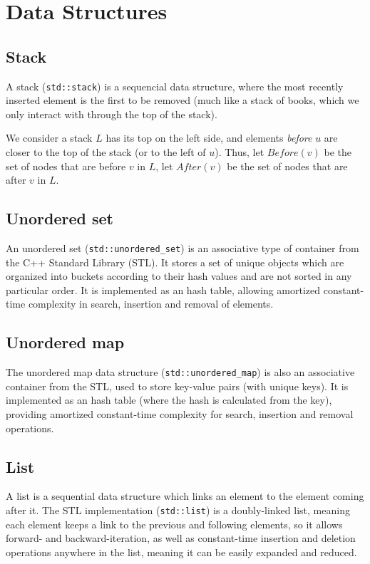 \chapter{Data Structures} \label{data-structures}

\section{Stack}
A stack (\texttt{std::stack}) is a sequencial data structure, where the most recently inserted element is the first to be removed (much like a stack of books, which we only interact with through the top of the stack).\par
We consider a stack $L$ has its top on the left side, and elements \emph{before} $u$ are closer to the top of the stack (or to the left of $u$). Thus, let $Before(v)$ be the set of nodes that are before $v$ in $L$, let $After(v)$ be the set of nodes that are after $v$ in $L$.

\section{Unordered set}
An unordered set (\texttt{std::unordered\_set}) is an associative type of container from the C++ Standard Library (STL). It stores a set of unique objects which are organized into buckets according to their hash values and are not sorted in any particular order. It is implemented as an hash table, allowing amortized constant-time complexity in search, insertion and removal of elements.

\section{Unordered map}
The unordered map data structure (\texttt{std::unordered\_map}) is also an associative container from the STL, used to store key-value pairs (with unique keys). It is implemented as an hash table (where the hash is calculated from the key), providing amortized constant-time complexity for search, insertion and removal operations.

\section{List}
A list is a sequential data structure which links an element to the element coming after it. The STL implementation (\texttt{std::list}) is a doubly-linked list, meaning each element keeps a link to the previous and following elements, so it allows forward- and backward-iteration, as well as constant-time insertion and deletion operations anywhere in the list, meaning it can be easily expanded and reduced.

